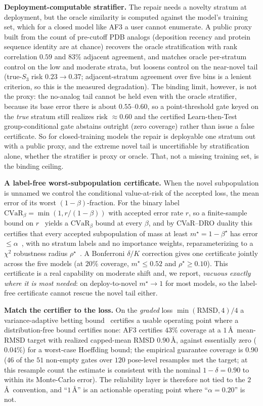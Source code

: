 \documentclass[10pt]{article}
\begin{document}
\textbf{Deployment-computable stratifier.} The repair needs a novelty stratum at deployment, but the
oracle similarity is computed against the model's training set, which for a closed model like AF3 a user
cannot enumerate. A public proxy built from the count of pre-cutoff PDB analogs (deposition recency and
protein sequence identity are at chance) recovers the oracle stratification with rank correlation $0.59$
and $83\%$ adjacent agreement, and matches oracle per-stratum control on the low and moderate strata, but
loosens control on the near-novel tail (true-$S_3$ risk $0.23\!\to\!0.37$; adjacent-stratum agreement over
five bins is a lenient criterion, so this is the measured degradation). The binding limit, however, is not
the proxy: the no-analog tail cannot be held even with the oracle stratifier, because its base error there
is about $0.55$--$0.60$, so a point-threshold gate keyed on the \emph{true} stratum still realizes risk
$\approx\!0.60$ and the certified Learn-then-Test group-conditional gate abstains outright (zero coverage)
rather than issue a false certificate. So for closed-training models the repair is deployable one stratum
out with a public proxy, and the extreme novel tail is uncertifiable by stratification alone, whether the
stratifier is proxy or oracle. That, not a missing training set, is the binding ceiling.

\textbf{A label-free worst-subpopulation certificate.} When the novel subpopulation is unnamed we control
the conditional value-at-risk of the accepted loss, the mean error of its worst $(1-\beta)$-fraction. For
the binary label $\mathrm{CVaR}_\beta=\min(1,r/(1-\beta))$ with accepted error rate $r$, so a finite-sample
bound on $r$~\citep{bates2021rcps} yields a $\mathrm{CVaR}_\beta$ bound at every $\beta$, and by CVaR--DRO
duality this certifies that every accepted subpopulation of mass at least $m^\star=1-\beta^\star$ has error
$\le\alpha$~\citep{snell2022qrc}, with no stratum labels and no importance weights, reparameterizing to a
$\chi^2$ robustness radius $\rho^\star$~\citep{cauchois2024}. A Bonferroni $\delta/K$ correction gives one
certificate jointly across the five models (at $20\%$ coverage, $m^\star\le0.52$ and $\rho^\star\ge0.10$).
This certificate is a real capability on moderate shift and, we report, \emph{vacuous exactly where
it is most needed}: on deploy-to-novel $m^\star\!\to\!1$ for most models, so the label-free certificate
cannot rescue the novel tail either.

\textbf{Match the certifier to the loss.} On the \emph{graded} loss $\min(\text{RMSD},4)/4$ a
variance-adaptive betting bound~\citep{waudbysmith2024betting} certifies a usable operating point where a
distribution-free bound certifies none: AF3 certifies $43\%$ coverage at a $1$\,\AA\ mean-RMSD target with
realized capped-mean RMSD $0.90$\,\AA, against essentially zero ($0.04\%$) for a worst-case Hoeffding bound;
the empirical guarantee coverage is $0.90$ ($46$ of the $51$ non-empty gates over $120$ pose-level
resamples met the target; at this resample count the estimate is consistent with the nominal $1-\delta=0.90$
to within its Monte-Carlo error). The reliability layer is therefore not tied
to the $2$\,\AA\ convention, and ``$1$\,\AA'' is an actionable operating point where ``$\alpha=0.20$'' is not.
\end{document}
